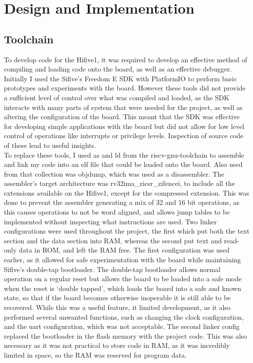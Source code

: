 \chapter{Design and Implementation}
\label{cha:design}
\section{Toolchain}
To develop code for the Hifive1, it was required to develop an effective method of compiling and loading code onto the board, as well as an effective debugger. Initially I used the Sifive's Freedom E SDK with PlatformIO to perform basic prototypes and experiments with the board. However these tools did not provide a sufficient level of control over what was compiled and loaded, as the SDK interacts with many parts of system that were needed for the project, as well as altering the configuration of the board. This meant that the SDK was effective for developing simple applications with the board but did not allow for low level control of operations like interrupts or privilege levels. Inspection of source code of these lead to useful insights.\\
To replace these tools, I used as and ld from the riscv-gnu-toolchain to assemble and link my code into an elf file that could be loaded onto the board. Also used from that collection was objdump, which was used as a disassembler. The assembler's target architecture was rv32ima\_zicsr\_zifencei, to include all the extensions available on the Hifive1, except for the compressed extension. This was done to prevent the assembler generating a mix of 32 and 16 bit operations, as this causes operations to not be word aligned, and allows jump tables to be implemented without inspecting what instructions are used. Two linker configurations were used throughout the project, the first which put both the text section and the data section into RAM, whereas the second put text and read-only data in ROM, and left the RAM free. The first configuration was used earlier, as it allowed for safe experimentation with the board while maintaining Sifive's double-tap bootloader. The double-tap bootloader allows normal operation on a regular reset but allows the board to be loaded into a safe mode when the reset is `double tapped', which loads the board into a safe and known state, so that if the board becomes otherwise inoperable it is still able to be recovered. While this was a useful feature, it limited development, as it also performed several unwanted functions, such as changing the clock configuration, and the uart configuration, which was not acceptable. The second linker config replaced the bootloader in the flash memory with the project code. This was also necessary as it was not practical to store code in RAM, as it was incredibly limited in space, so the RAM was reserved for program data.\\
